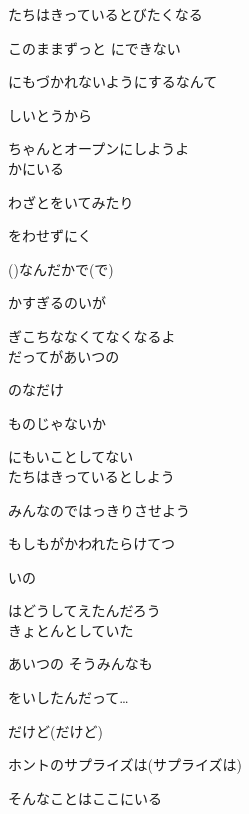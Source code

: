 
たちはきっているとびたくなる

このままずっと にできない

にもづかれないようにするなんて

しいとうから

ちゃんとオープンにしようよ
\\

かにいる

わざとをいてみたり

をわせずにく

()なんだかで(で)

かすぎるのいが

ぎこちななくてなくなるよ
\\

だってがあいつの

のなだけ

ものじゃないか

にもいことしてない
\\

たちはきっているとしよう

みんなのではっきりさせよう

もしもがかわれたらけてつ

いの

はどうしてえたんだろう
\\

 きょとんとしていた

あいつの そうみんなも

をいしたんだって…

だけど(だけど)

ホントのサプライズは(サプライズは)

そんなことはここにいる

